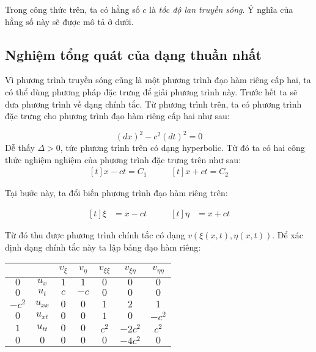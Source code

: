 \documentclass[a4paper]{article}
\begin{document}
Trong công thức trên, ta có hằng số $c$ là \emph{tốc độ lan truyền sóng}. Ý nghĩa của hằng số này sẽ được mô tả ở dưới.

\subsection{Nghiệm tổng quát của dạng thuần nhất}

Vì phương trình truyền sóng cũng là một phương trình đạo hàm riêng cấp hai, ta có thể dùng phương pháp đặc trưng để giải phương trình này. Trước hết ta sẽ đưa phương trình về dạng chính tắc. Từ phương trình trên, ta có phương trình đặc trưng cho phương trình đạo hàm riêng cấp hai như sau:

\begin{equation*}
(dx)^2 - c^2(dt)^2 = 0
\end{equation*}
Dễ thấy $\Delta > 0$, tức phương trình trên có dạng hyperbolic. Từ đó ta có hai công thức nghiệm nghiệm của phương trình đặc trưng trên như sau:
\begin{equation*}
\begin{aligned}[t]
x - ct = C_1
\end{aligned}
\qquad
\begin{aligned}[t]
x + ct = C_2
\end{aligned}
\end{equation*}

Tại bước này, ta đổi biến phương trình đạo hàm riêng trên:

\begin{equation*}
\begin{aligned}[t]
\xi &= x - ct
\end{aligned}
\qquad
\begin{aligned}[t]
\eta &= x + ct
\end{aligned}
\end{equation*}

Từ đó thu được phương trình chính tắc có dạng $v(\xi(x, t), \eta(x, t))$. Để xác định dạng chính tắc này ta lập bảng đạo hàm riêng:

\begin{center}
\begin{tabular}{|c|c|c|c|c|c|c|}
\hline
       &          & $v_\xi$ & $v_\eta$ & $v_{\xi\xi}$ & $v_{\xi\eta}$ & $v_{\eta\eta}$ \\
\hline
$0$    & $u_x$    & $1$     & $1$      & $0$          & $0$           & $0$            \\
$0$    & $u_t$    & $c$     & $-c$     & $0$          & $0$           & $0$            \\
$-c^2$ & $u_{xx}$ & $0$     & $0$      & $1$          & $2$           & $1$            \\
$0$    & $u_{xt}$ & $0$     & $0$      & $1$          & $0$           & $-c^2$         \\
$1$    & $u_{tt}$ & $0$     & $0$      & $c^2$        & $-2c^2$       & $c^2$          \\
\hline
$0$    & $0$      & $0$     & $0$      & $0$          & $-4c^2$       & $0$            \\
\hline
\end{tabular}
\end{center}
\end{document}

